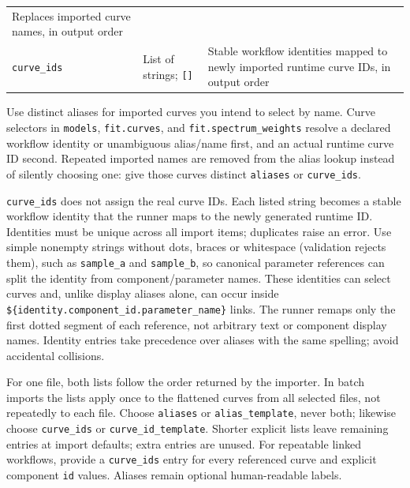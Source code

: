 \documentclass[
  10pt,
  a4paper,
  oneside]{scrreprt}
\begin{document}
\begin{longtable}[]{@{}lll@{}}
\begin{minipage}[t]{0.30\columnwidth}
Replaces imported curve names, in output order\strut
\end{minipage}\tabularnewline
\begin{minipage}[t]{0.30\columnwidth}\raggedright
\texttt{curve\_ids}\strut
\end{minipage} & \begin{minipage}[t]{0.30\columnwidth}\raggedright
List of strings; \texttt{{[}{]}}\strut
\end{minipage} & \begin{minipage}[t]{0.30\columnwidth}\raggedright
Stable workflow identities mapped to newly imported runtime curve IDs,
in output order\strut
\end{minipage}\tabularnewline
\bottomrule
\end{longtable}

Use distinct aliases for imported curves you intend to select by name.
Curve selectors in \texttt{models}, \texttt{fit.curves}, and
\texttt{fit.spectrum\_weights} resolve a declared workflow identity or
unambiguous alias/name first, and an actual runtime curve ID second.
Repeated imported names are removed from the alias lookup instead of
silently choosing one: give those curves distinct \texttt{aliases} or
\texttt{curve\_ids}.

\texttt{curve\_ids} does not assign the real curve IDs. Each listed
string becomes a stable workflow identity that the runner maps to the
newly generated runtime ID. Identities must be unique across all import
items; duplicates raise an error. Use simple nonempty strings without
dots, braces or whitespace (validation rejects them), such as
\texttt{sample\_a} and \texttt{sample\_b}, so canonical parameter
references can split the identity from component/parameter names. These
identities can select curves and, unlike display aliases alone, can
occur inside \texttt{\$\{identity.component\_id.parameter\_name\}}
links. The runner remaps only the first dotted segment of each
reference, not arbitrary text or component display names. Identity
entries take precedence over aliases with the same spelling; avoid
accidental collisions.

For one file, both lists follow the order returned by the importer. In
batch imports the lists apply once to the flattened curves from all
selected files, not repeatedly to each file. Choose \texttt{aliases} or
\texttt{alias\_template}, never both; likewise choose
\texttt{curve\_ids} or \texttt{curve\_id\_template}. Shorter explicit
lists leave remaining entries at import defaults; extra entries are
unused. For repeatable linked workflows, provide a \texttt{curve\_ids}
entry for every referenced curve and explicit component \texttt{id}
values. Aliases remain optional human-readable labels.
\end{document}
